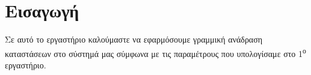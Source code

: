 \section{Εισαγωγή}
Σε αυτό το εργαστήριο καλούμαστε να εφαρμόσουμε γραμμική ανάδραση καταστάσεων στο σύστημά μας σύμφωνα με τις παραμέτρους που υπολογίσαμε στο 1\textsuperscript{ο} εργαστήριο.
